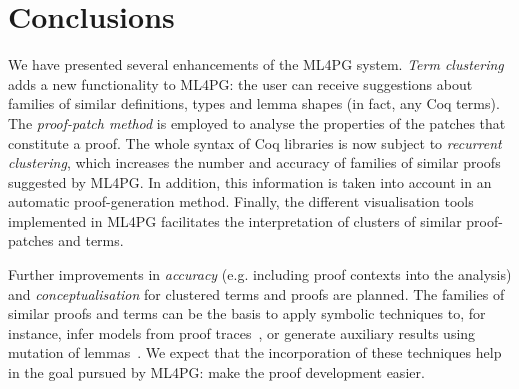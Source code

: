 \section{Conclusions}\label{sec:conclusions}

We have presented several enhancements of the ML4PG system. \emph{Term clustering} adds a new 
functionality to ML4PG: the user can receive suggestions about families of similar definitions, types and lemma shapes (in fact, any Coq terms). 
The \emph{proof-patch method} is employed to analyse the properties of the patches that constitute a proof. The whole syntax of Coq libraries is now subject to \emph{recurrent clustering}, which %
 increases the number and accuracy of families of similar proofs suggested by ML4PG. In addition, this information is taken into account in an automatic proof-generation method. Finally, the different visualisation tools implemented in ML4PG facilitates the interpretation of clusters of similar proof-patches and terms. 

Further improvements in \emph{accuracy} (e.g. including proof contexts into the analysis) and \emph{conceptualisation} for clustered terms and proofs are planned. The families of similar proofs and terms can be the basis to
apply symbolic techniques to, for instance, infer models from proof traces~\cite{GNR14}, or generate auxiliary results using
mutation of lemmas~\cite{lpar13}. We expect that the incorporation of these techniques help in the goal pursued by ML4PG: make the 
proof development easier. 




 
